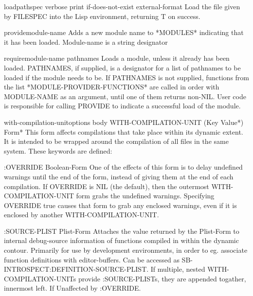 \documentclass[10pt,english]{book}
\begin{document}
\begin{function}{load}{pathspec \key verbose print if-does-not-exist external-format}
  Load the file given by FILESPEC into the Lisp environment, returning
   T on success.
\end{function}

\begin{function}{provide}{module-name}
  Adds a new module name to *MODULES* indicating that it has been loaded.
   Module-name is a string designator
\end{function}

\begin{function}{require}{module-name \op pathnames}
  Loads a module, unless it already has been loaded. PATHNAMES, if supplied,
   is a designator for a list of pathnames to be loaded if the module
   needs to be. If PATHNAMES is not supplied, functions from the list
   *MODULE-PROVIDER-FUNCTIONS* are called in order with MODULE-NAME
   as an argument, until one of them returns non-NIL.  User code is
   responsible for calling PROVIDE to indicate a successful load of the
   module.
\end{function}

\begin{macro}{with-compilation-unit}{options \body body}
  WITH-COMPILATION-UNIT ({Key Value}*) Form*
  This form affects compilations that take place within its dynamic extent. It
  is intended to be wrapped around the compilation of all files in the same
  system. These keywords are defined:

    :OVERRIDE Boolean-Form
        One of the effects of this form is to delay undefined warnings
        until the end of the form, instead of giving them at the end of each
        compilation. If OVERRIDE is NIL (the default), then the outermost
        WITH-COMPILATION-UNIT form grabs the undefined warnings. Specifying
        OVERRIDE true causes that form to grab any enclosed warnings, even if
        it is enclosed by another WITH-COMPILATION-UNIT.

    :SOURCE-PLIST Plist-Form
        Attaches the value returned by the Plist-Form to internal debug-source
        information of functions compiled in within the dynamic contour.
        Primarily for use by development environments, in order to eg. associate
        function definitions with editor-buffers. Can be accessed as
        SB-INTROSPECT:DEFINITION-SOURCE-PLIST. If multiple, nested
        WITH-COMPILATION-UNITs provide :SOURCE-PLISTs, they are appended
        togather, innermost left. If  Unaffected by :OVERRIDE.
\end{macro}
\end{document}
